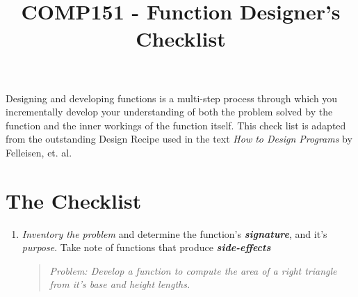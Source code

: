 \documentclass[nobib]{tufte-handout}
\title{COMP151 - Function Designer's Checklist}
\author{  }
\date{}
\begin{document}
\maketitle

Designing and developing functions is a multi-step process through which you incrementally develop your understanding of both the problem solved by the function and the inner workings of the function itself. This check list is adapted from the outstanding Design Recipe used in the text \textit{How to Design Programs} by Felleisen, et. al.

\section{ The Checklist }

\begin{enumerate}
  \item \textit{Inventory the problem} and determine the function's \textit{\textbf{signature}}, and it's \textit{purpose}. Take note of functions that produce \textit{\textbf{side-effects}} 
  \begin{quote}
    \textit{Problem: Develop a function to compute the area of a right triangle from it's base and height lengths.} 
    

\end{quote}
\end{enumerate}
\end{document}
